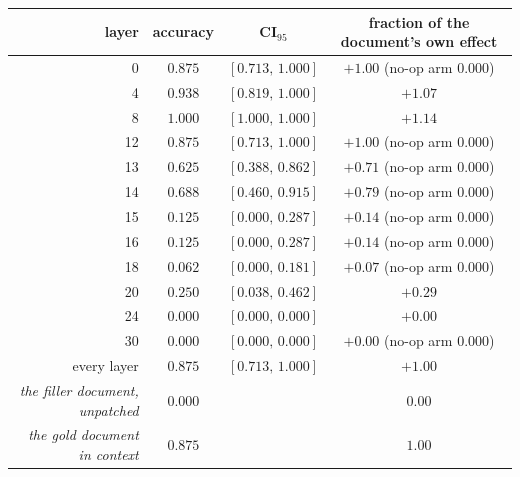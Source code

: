 \begin{tabular}{@{}rccc@{}}
\toprule
layer & accuracy & CI$_{95}$ & fraction of the document's own effect \\
\midrule
0 & $0.875$ & $[0.713,\,1.000]$ & $+1.00$ \quad\tiny(no-op arm 0.000) \\
4 & $0.938$ & $[0.819,\,1.000]$ & $+1.07$ \\
8 & $1.000$ & $[1.000,\,1.000]$ & $+1.14$ \\
12 & $0.875$ & $[0.713,\,1.000]$ & $+1.00$ \quad\tiny(no-op arm 0.000) \\
13 & $0.625$ & $[0.388,\,0.862]$ & $+0.71$ \quad\tiny(no-op arm 0.000) \\
14 & $0.688$ & $[0.460,\,0.915]$ & $+0.79$ \quad\tiny(no-op arm 0.000) \\
15 & $0.125$ & $[0.000,\,0.287]$ & $+0.14$ \quad\tiny(no-op arm 0.000) \\
16 & $0.125$ & $[0.000,\,0.287]$ & $+0.14$ \quad\tiny(no-op arm 0.000) \\
18 & $0.062$ & $[0.000,\,0.181]$ & $+0.07$ \quad\tiny(no-op arm 0.000) \\
20 & $0.250$ & $[0.038,\,0.462]$ & $+0.29$ \\
24 & $0.000$ & $[0.000,\,0.000]$ & $+0.00$ \\
30 & $0.000$ & $[0.000,\,0.000]$ & $+0.00$ \quad\tiny(no-op arm 0.000) \\
\midrule
every layer & $0.875$ & $[0.713,\,1.000]$ & $+1.00$ \\
\midrule
\emph{the filler document, unpatched} & $0.000$ & & $0.00$ \\
\emph{the gold document in context} & $0.875$ & & $1.00$ \\
\bottomrule
\end{tabular}
